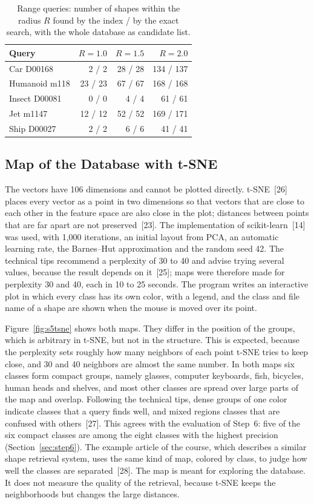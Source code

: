 \documentclass[10pt,a4paper]{article}
\begin{document}
\begin{table}[htbp]\centering\small
\begin{tabular}{@{}lrrr@{}}\toprule
Query & $R=1.0$ & $R=1.5$ & $R=2.0$\\\midrule
Car D00168 & 2 / 2 & 28 / 28 & 134 / 137\\
Humanoid m118 & 23 / 23 & 67 / 67 & 168 / 168\\
Insect D00081 & 0 / 0 & 4 / 4 & 61 / 61\\
Jet m1147 & 12 / 12 & 52 / 52 & 169 / 171\\
Ship D00027 & 2 / 2 & 6 / 6 & 41 / 41\\
\bottomrule\end{tabular}
\caption{Range queries: number of shapes within the radius $R$ found by the index / by the exact search, with the whole database
as candidate list.}
\label{tab:s5range}
\end{table}

\subsection{Map of the Database with t-SNE}\label{sec:s5tsne}
The vectors have 106 dimensions and cannot be plotted directly. t-SNE~[26] places every vector as a point in two dimensions so
that vectors that are close to each other in the feature space are also close in the plot; distances between points that are far
apart are not preserved~[23]. The implementation of scikit-learn~[14] was used, with 1,000 iterations, an initial layout from
PCA, an automatic learning rate, the Barnes--Hut approximation and the random seed 42. The technical tips recommend a perplexity
of 30 to 40 and advise trying several values, because the result depends on it~[25]; maps were therefore made for perplexity 30
and 40, each in 10 to 25 seconds. The program writes an interactive plot in which every class has its own color, with a legend,
and the class and file name of a shape are shown when the mouse is moved over its point.

Figure~\ref{fig:s5tsne} shows both maps. They differ in the position of the groups, which is arbitrary in t-SNE, but not in the
structure. This is expected, because the perplexity sets roughly how many neighbors of each point t-SNE tries to keep close, and
30 and 40 neighbors are almost the same number. In both maps six classes form compact groups, namely glasses, computer keyboards, fish, bicycles, human heads and
shelves, and most other classes are spread over large parts of the map and overlap. Following the technical tips, dense groups of
one color indicate classes that a query finds well, and mixed regions classes that are confused with others~[27]. This agrees with
the evaluation of Step~6: five of the six compact classes are among the eight classes with the highest precision
(Section~\ref{sec:step6}). The example article of the course, which describes a similar shape retrieval system, uses the same kind of map, colored by class, to judge how well
the classes are separated~[28]. The map is meant for exploring the database. It does not measure the quality of the retrieval, because
t-SNE keeps the neighborhoods but changes the large distances.
\end{document}
